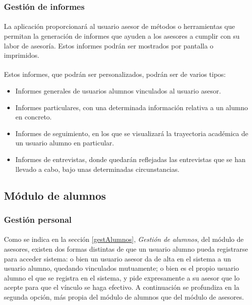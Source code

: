       \subsubsection{Gestión de informes}

      \paragraph{}La aplicación proporcionará al usuario asesor de métodos o
      herramientas que permitan la generación de informes que ayuden a los
      asesores a cumplir con su labor de asesoría. Estos informes podrán ser
      mostrados por pantalla o imprimidos.

      \paragraph{}Estos informes, que podrán ser personalizados, podrán ser
      de varios tipos:

      \begin{itemize}
       \item Informes generales de usuarios alumnos vinculados al usuario
             asesor.
       \item Informes particulares, con una determinada información relativa a
             un alumno en concreto.
       \item Informes de seguimiento, en los que se visualizará la trayectoria
             académica de un usuario alumno en particular.
       \item Informes de entrevistas, donde quedarán reflejadas las entrevistas
             que se han llevado a cabo, bajo unas determinadas circunstancias.
      \end{itemize}


   \subsection{Módulo de alumnos}\label{modAlumnos}

      \subsubsection{Gestión personal}

      \paragraph{}Como se indica en la sección \ref{gestAlumnos},
      \textit{Gestión de alumnos}, del módulo de asesores, existen dos formas
      distintas de que un usuario alumno pueda registrarse para acceder sistema:
      o bien un usuario asesor da de alta en el sistema a un usuario alumno,
      quedando vinculados mutuamente; o bien es el propio usuario alumno el que
      se registra en el sistema, y pide expresamente a su asesor que lo acepte
      para que el vínculo se haga efectivo. A continuación se profundiza en
      la segunda opción, más propia del módulo de alumnos que del módulo de
      asesores.

